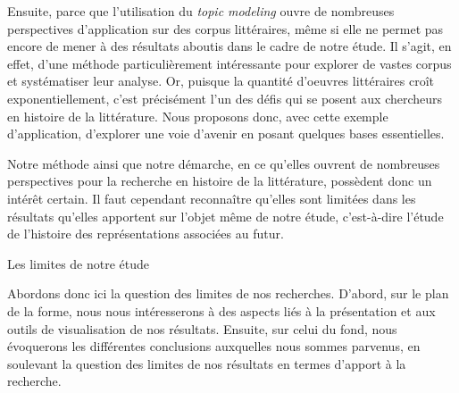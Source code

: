 \documentclass[letterpaper,portrait,12pt]{article}
\begin{document}
\textcolor[rgb]{0.000,0.000,0.000}{	Ensuite, parce que l'utilisation du }\emph{\textcolor[rgb]{0.000,0.000,0.000}{topic modeling}}\textcolor[rgb]{0.000,0.000,0.000}{ ouvre de nombreuses perspectives d'application sur des corpus litt\'{e}raires, m\^{e}me si elle ne permet pas encore de mener \`{a} des r\'{e}sultats aboutis dans le cadre de notre \'{e}tude. Il s'agit, en effet, d'une m\'{e}thode particuli\`{e}rement int\'{e}ressante pour explorer de vastes corpus et syst\'{e}matiser leur analyse. Or, puisque la quantit\'{e} d'oeuvres litt\'{e}raires cro\^{i}t exponentiellement, c'est pr\'{e}cis\'{e}ment l'un des d\'{e}fis qui se posent aux chercheurs en histoire de la litt\'{e}rature. Nous proposons donc, avec cette exemple d'application, d'explorer une voie d'avenir en posant quelques bases essentielles. }





	Notre m\'{e}thode ainsi que notre d\'{e}marche, en ce qu'elles ouvrent de nombreuses perspectives pour la recherche en histoire de la litt\'{e}rature, poss\`{e}dent donc un int\'{e}r\^{e}t certain. Il faut cependant reconna\^{i}tre qu'elles sont limit\'{e}es dans les r\'{e}sultats qu'elles apportent sur l'objet m\^{e}me de notre \'{e}tude, c'est-\`{a}-dire l'\'{e}tude de l'histoire des repr\'{e}sentations associ\'{e}es au futur.








	Les limites de notre \'{e}tude





	Abordons donc ici la question des limites de nos recherches. D'abord, sur le plan de la forme, nous nous int\'{e}resserons \`{a} des aspects li\'{e}s \`{a} la pr\'{e}sentation et aux outils de visualisation de nos r\'{e}sultats. Ensuite, sur celui du fond, nous \'{e}voquerons les diff\'{e}rentes conclusions auxquelles nous sommes parvenus, en soulevant la question des limites de nos r\'{e}sultats en termes d'apport \`{a} la recherche.
\end{document}
